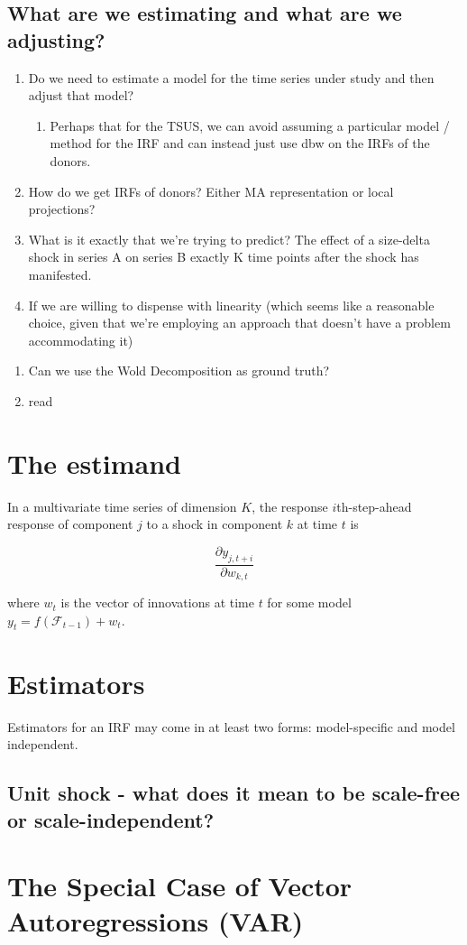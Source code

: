 \documentclass[11pt]{article}
\theoremstyle{definition}
\begin{document}
\subsection{What are we estimating and what are we adjusting?}
\begin{enumerate}
  \item Do we need to estimate a model for the time series under study and then adjust that model?
  \begin{enumerate}
  \item Perhaps that for the TSUS, we can avoid assuming a particular model / method for the IRF and can instead just use dbw on the IRFs of the donors. 
  \end{enumerate}
  \item How do we get IRFs of donors? Either MA representation or local projections?
  \item What is it exactly that we're trying to predict?  The effect of a size-delta shock in series A on series B exactly K time points after the shock has manifested.
  \item If we are willing to dispense with linearity (which seems like a reasonable choice, given that we're employing an approach that doesn't have a problem accommodating it)
\end{enumerate}

\begin{enumerate}
    \item Can we use the Wold Decomposition as ground truth?
    \item read \citet{ho2023averaging}
\end{enumerate}

\section{The estimand}

In a multivariate time series of dimension $K$, the response $i$th-step-ahead response of component $j$ to a shock in component $k$ at time $t$ is

\[
   \frac{\partial y_{j,t+i}}{\partial w_{k,t}}
\]

where $w_{t}$ is the vector of innovations at time $t$ for some model $y_{t} = f(\mathcal{F}_{t-1}) + w_{t}$.

\section{Estimators}

Estimators for an IRF may come in at least two forms: model-specific and model independent.

\subsection{Unit shock - what does it mean to be scale-free or scale-independent?}

\section{The Special Case of Vector Autoregressions (VAR)}



  
\end{document}
